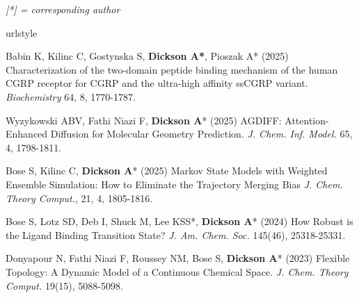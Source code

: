\documentclass[margin,line]{res}
\begin{document}
\begin{resume}

\emph{[*] = corresponding author}
\vspace {0.05in}

\begingroup
\begin{spacing}{1.2}
\renewcommand{\section}[2]{}%
\begin{thebibliography}{10}
\providecommand{\url}[1]{\texttt{#1}}
\providecommand{\urlprefix}{URL }
\expandafter\ifx\csname urlstyle\endcsname\relax
  \providecommand{\doi}[1]{doi:\discretionary{}{}{}#1}\else
  \providecommand{\doi}{doi:\discretionary{}{}{}\begingroup
  \urlstyle{rm}\Url}\fi
\providecommand{\bibAnnoteFile}[1]{%
  \IfFileExists{#1}{\begin{quotation}\noindent\textsc{Key:} #1\\
  \textsc{Annotation:}\ \end{quotation}}{}}
\providecommand{\bibAnnote}[2]{%
  \begin{quotation}\noindent\textsc{Key:} #1\\
  \textsc{Annotation:}\ #2\end{quotation}}
\providecommand{\eprint}[2][]{\url{#2}}

\setlength{\itemsep}{0.15in}

  Babin K, Kilinc C, Gostynska S, {\bf Dickson A*}, Pioszak A* (2025) Characterization of the two-domain peptide binding mechanism of the human CGRP receptor for CGRP and the ultra-high affinity ssCGRP variant.
  \newblock \textit{Biochemistry} 64, 8, 1770-1787.

  Wyzykowski ABV, Fathi Niazi F, {\bf Dickson A}* (2025) AGDIFF: Attention-Enhanced Diffusion for Molecular Geometry Prediction.
  \newblock \textit{J. Chem. Inf. Model.} 65, 4, 1798-1811.

  Bose S, Kilinc C, {\bf Dickson A}* (2025) Markov State Models with Weighted Ensemble Simulation: How to Eliminate the Trajectory Merging Bias 
  \newblock \textit{J. Chem. Theory Comput.}, 21, 4, 1805-1816.

  Bose S, Lotz SD, Deb I, Shuck M, Lee KSS*, {\bf Dickson A}* (2024) How Robust is the Ligand Binding Transition State?
  \newblock \textit{J. Am. Chem. Soc.} 145(46), 25318-25331. 

  Donyapour N, Fathi Niazi F, Roussey NM, Bose S, {\bf Dickson A}* (2023) Flexible Topology: A Dynamic Model of a Continuous Chemical Space.
  \newblock \textit{J. Chem. Theory Comput.} 19(15), 5088-5098. 


\end{thebibliography}
\end{spacing}
\end{resume}
\end{document}
